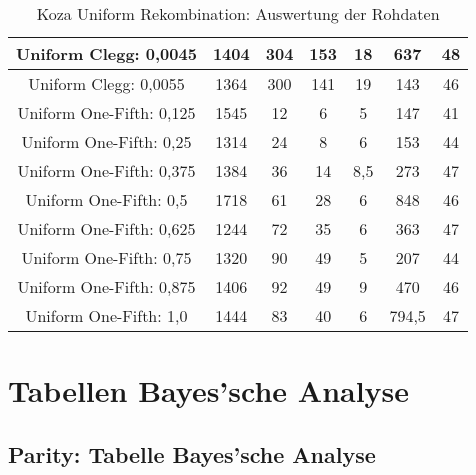 \begin{table}[H]
\begin{tabular}{c | c | c | c | c | c | c}
		\hline
		Uniform Clegg: 0,0045 & 1404 & 304 & 153 & 18 & 637 & 48\\
		\hline
		Uniform Clegg: 0,0055 & 1364 & 300 & 141 & 19 & 143 & 46\\
		\hline
		Uniform One-Fifth: 0,125 & 1545 & 12 & 6 & 5 & 147 & 41\\
		\hline
		Uniform One-Fifth: 0,25 & 1314 & 24 & 8 & 6 & 153 & 44\\
		\hline
		Uniform One-Fifth: 0,375 & 1384 & 36 & 14 & 8,5 & 273 & 47\\
		\hline
		Uniform One-Fifth: 0,5 & 1718 & 61 & 28 & 6 & 848 & 46\\
		\hline
		Uniform One-Fifth: 0,625 & 1244 & 72 & 35 & 6 & 363 & 47\\
		\hline
		Uniform One-Fifth: 0,75 & 1320 & 90 & 49 & 5 & 207 & 44\\
		\hline
		Uniform One-Fifth: 0,875 & 1406 & 92 & 49 & 9 & 470 & 46\\
		\hline
		Uniform One-Fifth: 1,0 & 1444 & 83 & 40 & 6 & 794,5 & 47\\
	\end{tabular}
	\caption{Koza Uniform Rekombination: Auswertung der Rohdaten}
	\label{table:kozaUniformRohdaten}
\end{table}

\section{Tabellen Bayes'sche Analyse}
\label{sec:appendixTabellenBayes}

\subsection{Parity: Tabelle Bayes'sche Analyse}
\label{subsec:appendixTabelleBayesParity}


